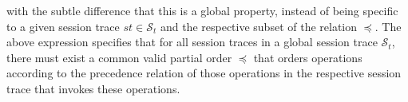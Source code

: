 \documentclass[journal,compsoc]{IEEEtran}
\begin{document}
with the subtle difference that this is a global property, instead of being specific to a given session trace $\mathit{st} \in \mathcal{S}_t$ and the respective subset of the relation $\preccurlyeq$. The above expression specifies that for  all session traces in a global session trace $\mathcal{S}_t$, there must exist a common valid partial order $\preccurlyeq$ that orders operations according to the precedence relation of those operations in the respective session trace that invokes these operations. %
\end{document}
